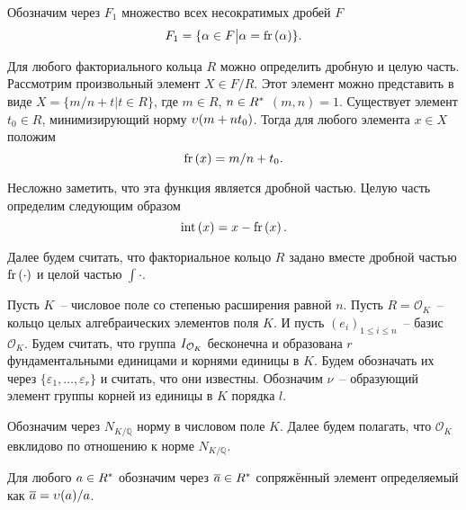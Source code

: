 \documentclass[_00_dissertation.tex]{subfiles}
\begin{document}
\begin{definition}
    Обозначим через $F_1$ множество всех несократимых дробей $F$
    \begin{equation*}
        F_1 = \{
            \alpha \in F \big| \alpha = \textrm{fr}\left(\alpha\right)
        \}.
    \end{equation*}
\end{definition}

\begin{remark}\label{remark:easy_fr}
    Для любого факториального кольца $R$ можно определить дробную и целую часть.
    Рассмотрим произвольный элемент $X \in F/R$.
    Этот элемент можно представить в виде $X = \{m/n + t | t \in R\}$, где $m \in R$, $n \in R^{*}$ $(m, n) = 1$.
    Существует элемент $t_0 \in R$, минимизирующий норму $\upsilon(m + n t_0)$.
    Тогда для любого элемента $x \in X$ положим
    \begin{equation*}
        \textrm{fr}\left(x\right) = m/n + t_0.
    \end{equation*}

    Несложно заметить, что эта функция является дробной частью.
    Целую часть определим следующим образом
    \begin{equation*}
        \textrm{int}\left(x\right) = x - \textrm{fr}\left(x\right).
    \end{equation*}
\end{remark}

Далее будем считать, что факториальное кольцо $R$ задано вместе дробной частью $\textrm{fr}\left(\cdot\right)$ и целой частью $\int{\cdot}$.


Пусть $K$~-- числовое поле со степенью расширения равной $n$.
Пусть $R = \mathcal{O}_K$~-- кольцо целых алгебраических элементов поля $K$.
И пусть $(e_i)_{1 \le i \le n}$~-- базис $\mathcal{O}_K$.
Будем считать, что группа $I_{\mathcal{O}_K}$ бесконечна и образована $r$ фундаментальными единицами и корнями единицы в $K$.
Будем обозначать их через $\{\varepsilon_1, \dots, \varepsilon_r\}$ и считать, что они известны.
Обозначим $\nu$~-- образующий элемент группы корней из единицы в $K$ порядка $l$.

Обозначим через $N_{K/\mathbb{Q}}$ норму в числовом поле $K$.
Далее будем полагать, что $\mathcal{O}_K$ евклидово по отношению к норме $N_{K/\mathbb{Q}}$.

\begin{definition}
    Для любого $a \in R^{*}$ обозначим через $\overline{a} \in R^{*}$ сопряжённый элемент определяемый как $\overline{a} = \upsilon(a)/a$.
\end{definition}
\end{document}
